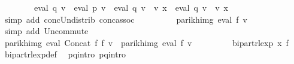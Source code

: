 \begin{isabellebody}
\ \ \ \ \ \ \ \ eval\ q{}\ v\ {\isacharat}{\kern0pt}{\isacharat}{\kern0pt}\ eval\ p{}\ v\ {\isasymunion}\ eval\ q{}\ v\ {\isacharat}{\kern0pt}{\isacharat}{\kern0pt}\ v\ x\ {\isacharat}{\kern0pt}{\isacharat}{\kern0pt}\ eval\ q{}\ v{\isacharparenright}{\kern0pt}\ {\isacharat}{\kern0pt}{\isacharat}{\kern0pt}\ v\ x{\isacharparenright}{\kern0pt}{\isachardoublequoteclose}\isanewline
\ \ \ \ \ \ \isamarkupfalse%
\ {\isacharparenleft}{\kern0pt}simp\ add{\isacharcolon}{\kern0pt}\ conc{\isacharunderscore}{\kern0pt}Un{\isacharunderscore}{\kern0pt}distrib{\isacharparenleft}{\kern0pt}{}{\isacharparenright}{\kern0pt}\ conc{\isacharunderscore}{\kern0pt}assoc{\isacharparenright}{\kern0pt}\isanewline
\ \ \ \ \isamarkupfalse%
\ \isamarkupfalse%
\ {\isachardoublequoteopen}{\isasymdots}\ {\isacharequal}{\kern0pt}\ parikh{\isacharunderscore}{\kern0pt}img\ {\isacharparenleft}{\kern0pt}eval\ {\isacharquery}{\kern0pt}f{\isacharprime}{\kern0pt}\ v{\isacharparenright}{\kern0pt}{\isachardoublequoteclose}\isanewline
\ \ \ \ \ \ \isamarkupfalse%
\ {\isacharparenleft}{\kern0pt}simp\ add{\isacharcolon}{\kern0pt}\ Un{\isacharunderscore}{\kern0pt}commute{\isacharparenright}{\kern0pt}\isanewline
\ \ \ \ \isamarkupfalse%
\ \isamarkupfalse%
\ {\isachardoublequoteopen}parikh{\isacharunderscore}{\kern0pt}img\ {\isacharparenleft}{\kern0pt}eval\ {\isacharparenleft}{\kern0pt}Concat\ f{}\ f{}{\isacharparenright}{\kern0pt}\ v{\isacharparenright}{\kern0pt}\ {\isacharequal}{\kern0pt}\ parikh{\isacharunderscore}{\kern0pt}img\ {\isacharparenleft}{\kern0pt}eval\ {\isacharquery}{\kern0pt}f{\isacharprime}{\kern0pt}\ v{\isacharparenright}{\kern0pt}{\isachardoublequoteclose}\ \isakeywordONE{{\isachardot}{\kern0pt}}\isamarkupfalse%
\isanewline
\ \ \isamarkupfalse%
\isanewline
\ \ \isamarkupfalse%
\ \isamarkupfalse%
\ {\isachardoublequoteopen}bipart{\isacharunderscore}{\kern0pt}rlexp\ x\ {\isacharquery}{\kern0pt}f{\isacharprime}{\kern0pt}{\isachardoublequoteclose}\ \isamarkupfalse%
\ bipart{\isacharunderscore}{\kern0pt}rlexp{\isacharunderscore}{\kern0pt}def\ \isamarkupfalse%
\ p{}{\isacharunderscore}{\kern0pt}q{}{\isacharunderscore}{\kern0pt}intro\ p{}{\isacharunderscore}{\kern0pt}q{}{\isacharunderscore}{\kern0pt}intro\ \isamarkupfalse%

\end{isabellebody}
